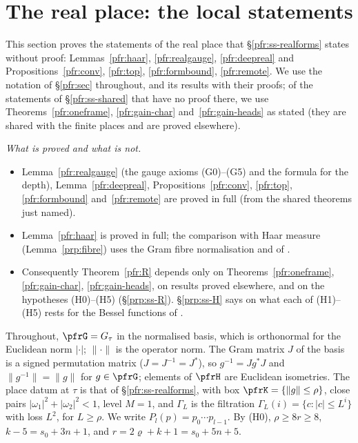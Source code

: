 \documentclass[10pt]{amsart}
\theoremstyle{definition}
\theoremstyle{remark}
\begin{document}
\section{The real place: the local statements}\label{prp:sec}

This section proves the statements of the real place that \S\ref{pfr:ss-realforms} states without
proof: Lemmas~\ref{pfr:haar}, \ref{pfr:realgauge}, \ref{pfr:deepreal} and
Propositions~\ref{pfr:conv}, \ref{pfr:top}, \ref{pfr:formbound}, \ref{pfr:remote}. We use the notation
of \S\ref{pfr:sec} throughout, and its results with their proofs; of the statements of
\S\ref{pfr:ss-shared} that have no proof there, we use Theorems~\ref{pfr:oneframe}, \ref{pfr:gain-char}
and~\ref{pfr:gain-heads} as stated (they are shared with the finite places and are proved elsewhere).

\emph{What is proved and what is not.}
\begin{itemize}
\item Lemma~\ref{pfr:realgauge} (the gauge axioms (G0)--(G5) and the formula for the depth),
Lemma~\ref{pfr:deepreal}, Propositions~\ref{pfr:conv}, \ref{pfr:top}, \ref{pfr:formbound}
and~\ref{pfr:remote} are proved in full (from the shared theorems just named).
\item Lemma~\ref{pfr:haar} is proved in full; the comparison with Haar measure (Lemma~\ref{prp:fibre})
uses the Gram fibre normalisation {\cite[Lemma~8.80]{P51}} and {\cite[Lemma~8.81]{P51}} of {\cite[\S8.4.4]{P51}}.
\item Consequently Theorem~\ref{pfr:R} depends only on Theorems~\ref{pfr:oneframe}, \ref{pfr:gain-char},
\ref{pfr:gain-heads}, on results proved elsewhere, and on the hypotheses (H0)--(H5)
(\S\ref{prp:ss-R}).
\S\ref{prp:ss-H} says on what each of (H1)--(H5) rests for the Bessel functions of
{\cite[Theorem~3.22]{P51}}.
\end{itemize}

Throughout, $\pfrG=G_\tau$ in the normalised basis, which is orthonormal for the Euclidean norm
$|\cdot|$; $\|\cdot\|$ is the operator norm. The Gram matrix $J$ of the basis is a signed permutation
matrix ($J=J^{-1}=J^*$), so $g^{-1}=Jg^*J$ and $\|g^{-1}\|=\|g\|$ for $g\in\pfrG$; elements of $\pfrH$ are
Euclidean isometries. The place datum at $\tau$ is that of \S\ref{pfr:ss-realforms}, with box
$\pfrK=\{\|g\|\le\rho\}$, close pairs $|\omega_1|^2+|\omega_2|^2<1$, level $M=1$, and $\Gamma_L$ is the
filtration $\Gamma_L(i)=\{c:|c|\le L^i\}$ with loss $L^2$, for $L\ge\rho$. We write
$P_l(p)=p_0\cdots p_{l-1}$. By (H0), $\rho\ge8r\ge8$, $k-5=s_0+3n+1$, and
$r=2\varrho+k+1=s_0+5n+5$.
\end{document}
